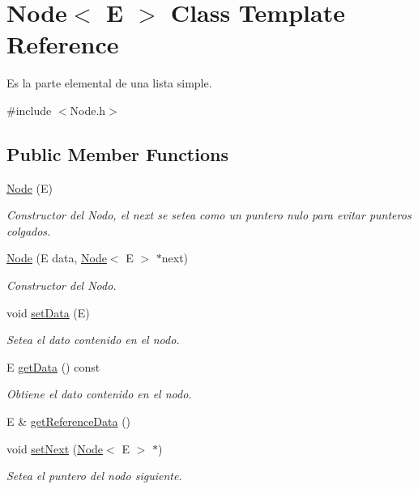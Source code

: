 \hypertarget{class_node}{\section{Node$<$ E $>$ Class Template Reference}
\label{class_node}
}


Es la parte elemental de una lista simple.  




{\ttfamily \#include $<$Node.\-h$>$}

\subsection*{Public Member Functions}
\begin{DoxyCompactItemize}
\item 
\hyperlink{class_node_a74d41f93c30d8c3036d24894f0e4314e}{Node} (E)
\begin{DoxyCompactList}\small\item\em Constructor del Nodo, el next se setea como un puntero nulo para evitar punteros colgados. \end{DoxyCompactList}\item 
\hyperlink{class_node_adc1b4c81c3fb6d0580f138650629a41e}{Node} (E data, \hyperlink{class_node}{Node}$<$ E $>$ $\ast$next)
\begin{DoxyCompactList}\small\item\em Constructor del Nodo. \end{DoxyCompactList}\item 
void \hyperlink{class_node_ae13418a552fa36eddbaa5dfb767aa664}{set\-Data} (E)
\begin{DoxyCompactList}\small\item\em Setea el dato contenido en el nodo. \end{DoxyCompactList}\item 
E \hyperlink{class_node_a02a4e5126542aaa1a2150932cfa2b8ce}{get\-Data} () const 
\begin{DoxyCompactList}\small\item\em Obtiene el dato contenido en el nodo. \end{DoxyCompactList}\item 
E \& \hyperlink{class_node_adec417c9f6f7d2cbd0fc7a72508e9c3d}{get\-Reference\-Data} ()
\item 
void \hyperlink{class_node_a2ce12b4f2605972720e1c56fe80014a0}{set\-Next} (\hyperlink{class_node}{Node}$<$ E $>$ $\ast$)
\begin{DoxyCompactList}\small\item\em Setea el puntero del nodo siguiente. \end{DoxyCompactList}\item 

\end{DoxyCompactItemize}

